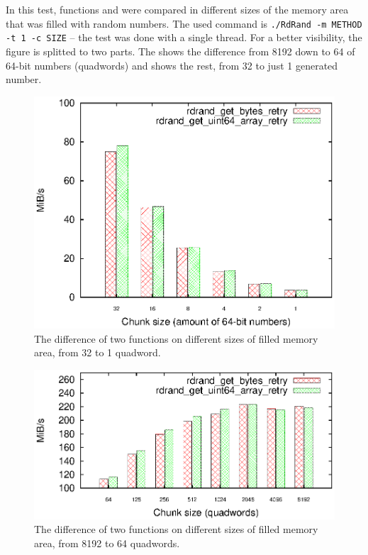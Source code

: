 In this test, functions  and  were compared in different sizes of the memory area that was filled with random numbers. The used command is {\tt ./RdRand -m METHOD -t 1 -c SIZE} -- the test was done with a single thread. For a better visibility, the figure is splitted to two parts. The  shows the difference from 8192 down to 64 of 64-bit numbers (quadwords) and  shows the rest, from 32 to just 1 generated number.

\begin{figure}[h!]
  \centering
 \includegraphics[width=12cm]{fig/tests/bytes_array_speed_low.eps} %
\caption{The difference of two functions on different sizes of filled memory area, from 32 to 1 quadword.}
\label{fig:testing:bytesArrayLow}
\end{figure}

\begin{figure}[h!]
  \centering
 \includegraphics[width=12cm]{fig/tests/bytes_array_speed_hi.eps} %
\caption{The difference of two functions on different sizes of filled memory area, from 8192 to 64 quadwords.}
\label{fig:testing:bytesArrayHi}
\end{figure}


